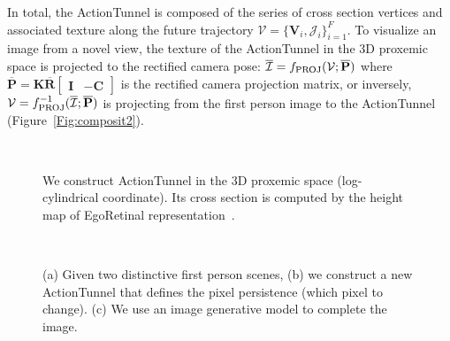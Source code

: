 \documentclass[10pt,twocolumn,letterpaper]{article}
\begin{document}
In total, the ActionTunnel is composed of the series of cross section vertices and associated texture along the future trajectory $\mathcal{V}=\{\mathbf{V}_i, \mathcal{J}_i\}_{i=1}^F$. To visualize an image from a novel view, the texture of the ActionTunnel in the 3D proxemic space is projected to the rectified camera pose: $\overline{\mathcal{I}} = f_{\rm PROJ}(\mathcal{V};\overline{\mathbf{P}})$ where $\overline{\mathbf{P}} =\mathbf{K}\overline{\mathbf{R}}\left[\begin{array}{cc} \mathbf{I} & -\mathbf{C}\end{array}\right]$ is the rectified camera projection matrix, or inversely, $\mathcal{V} = f_{\rm PROJ}^{-1}(\overline{\mathcal{I}};\overline{\mathbf{P}})$ is projecting from the first person image to the ActionTunnel (Figure~\ref{Fig:composit2}). 
\begin{figure}[t]
  \centering  
      ~~~
  \caption{We construct ActionTunnel in the 3D proxemic space (log-cylindrical coordinate). Its cross section is computed by the height map of EgoRetinal representation~\cite{park:2016_future}.} 
  \label{Fig:ego1}
\end{figure}

\begin{figure*}[th]
  \centering  
      ~
      ~
  \caption{(a) Given two distinctive first person scenes, (b) we construct a new ActionTunnel that defines the pixel persistence (which pixel to change). (c) We use an image generative model to complete the image.} 
  \label{Fig:composite}
\end{figure*}



\end{document}
